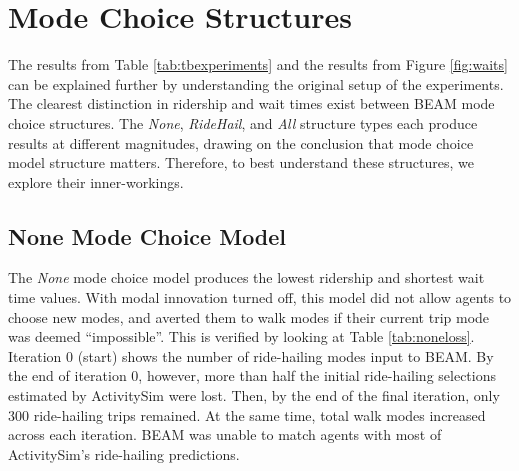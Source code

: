 \documentclass[fancy, masters]{byuthesis}
\begin{document}
\hypertarget{deep-look}{%
\section{Mode Choice Structures}\label{deep-look}}

The results from Table \ref{tab:tbexperiments} and the results from Figure \ref{fig:waits} can be explained further by understanding the original setup of the experiments. The clearest distinction in ridership and wait times exist between BEAM mode choice structures. The \emph{None}, \emph{RideHail}, and \emph{All} structure types each produce results at different magnitudes, drawing on the conclusion that mode choice model structure matters. Therefore, to best understand these structures, we explore their inner-workings.

\hypertarget{type1}{%
\subsection{None Mode Choice Model}\label{type1}}

The \emph{None} mode choice model produces the lowest ridership and shortest wait time values. With modal innovation turned off, this model did not allow agents to choose new modes, and averted them to walk modes if their current trip mode was deemed ``impossible''. This is verified by looking at Table \ref{tab:noneloss}. Iteration 0 (start) shows the number of ride-hailing modes input to BEAM. By the end of iteration 0, however, more than half the initial ride-hailing selections estimated by ActivitySim were lost. Then, by the end of the final iteration, only 300 ride-hailing trips remained. At the same time, total walk modes increased across each iteration. BEAM was unable to match agents with most of ActivitySim's ride-hailing predictions.

\begin{table}

\caption{\label{tab:noneloss}Loss of Ride-hailing Trips in the None Mode Choice Model}
\centering
{}
\end{table}
\end{document}
